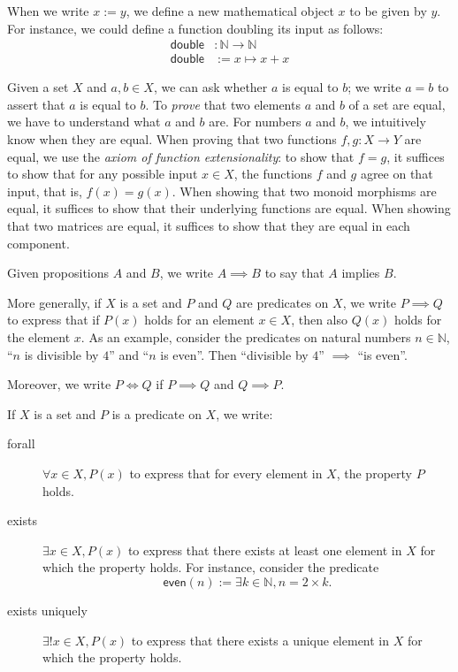 \documentclass[a4paper,11pt, oneside,titlepage=false]{scrbook}
\theoremstyle{plain}
\theoremstyle{definition}
\newcommand{\NN}{\ensuremath{\mathbb{N}}}
\begin{document}
\begin{description}
\item[Definitions] When we write $x := y$, we define a new mathematical object $x$ to be given by $y$.
  For instance, we could define a function doubling its input as follows:
  \begin{align*}
    \mathsf{double} &: \NN \to \NN
    \\
    \mathsf{double} &:=  x \mapsto x + x
  \end{align*}

\item[Equality] Given a set $X$ and $a,b\in X$, we can ask whether $a$ is equal to $b$; we write $a = b$ to assert that $a$ is equal to $b$.
  To \emph{prove} that two elements $a$ and $b$ of a set are equal, we have to understand what $a$ and $b$ are. For numbers $a$ and $b$, we intuitively know when they are equal.
  When proving that two functions $f, g : X \to Y$ are equal, we use the \emph{axiom of function extensionality}: to show that $f = g$, it suffices to show that for any possible input $x \in X$, the functions $f$ and $g$ agree on that input, that is, $f(x) = g(x)$.
  When showing that two monoid morphisms are equal, it suffices to show that their underlying functions are equal.
  When showing that two matrices are equal, it suffices to show that they are equal in each component.
\item [Implication]
  Given propositions $A$ and $B$, we write $A \implies B$ to say that $A$ implies $B$.

  More generally, if $X$ is a set and $P$ and $Q$ are predicates on $X$, we write $P\implies Q$ to express that if $P(x)$ holds for an element $x\in X$, then also $Q(x)$  holds for the element $x$.
  As an example, consider the predicates on natural numbers $n \in \NN$, ``$n$ is divisible by $4$'' and ``$n$ is even''.
  Then ``divisible by $4$'' $\implies$ ``is even''.

  Moreover, we write $P \iff Q$ if $P\implies Q$ and $Q\implies P$.
\item If $X$ is a set and $P$ is a predicate on $X$, we write:
\begin{description}
\item[forall] $\forall x\in X, P(x)$ to express that for every element in $X$, the property $P$ holds.
\item[exists] $\exists x\in X, P(x)$ to express that there exists at least one element in $X$ for which the property holds.
  For instance, consider the predicate
  \[  \mathsf{even}(n) := \exists k \in \NN, n = 2\times k.\]
\item[exists uniquely] $\exists! x\in X, P(x)$ to express that there exists a unique element in $X$ for which the property holds.
\end{description}
\end{description}
\end{document}
